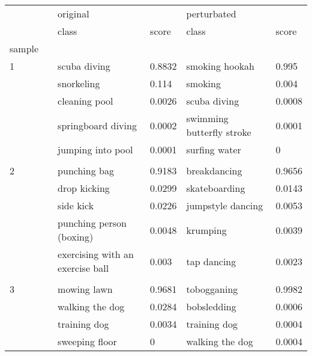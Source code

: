\begin{tabular}{llllll}
\toprule
  & {} & \multicolumn{2}{l}{original} & \multicolumn{2}{l}{perturbated} \\
  & {} &                             class &   score &                      class &   score \\
sample & {} &                                   &         &                            &         \\
\midrule
1 & {} &                      scuba diving &  0.8832 &             smoking hookah &   0.995 \\
  & {} &                        snorkeling &   0.114 &                    smoking &   0.004 \\
  & {} &                     cleaning pool &  0.0026 &               scuba diving &  0.0008 \\
  & {} &                springboard diving &  0.0002 &  swimming butterfly stroke &  0.0001 \\
  & {} &                 jumping into pool &  0.0001 &              surfing water &       0 \\
  & {} &                                   &         &                            &         \\
2 & {} &                      punching bag &  0.9183 &               breakdancing &  0.9656 \\
  & {} &                      drop kicking &  0.0299 &              skateboarding &  0.0143 \\
  & {} &                         side kick &  0.0226 &          jumpstyle dancing &  0.0053 \\
  & {} &          punching person (boxing) &  0.0048 &                   krumping &  0.0039 \\
  & {} &  exercising with an exercise ball &   0.003 &                tap dancing &  0.0023 \\
  & {} &                                   &         &                            &         \\
3 & {} &                       mowing lawn &  0.9681 &                tobogganing &  0.9982 \\
  & {} &                   walking the dog &  0.0284 &                bobsledding &  0.0006 \\
  & {} &                      training dog &  0.0034 &               training dog &  0.0004 \\
  & {} &                    sweeping floor &       0 &            walking the dog &  0.0004 \\

\end{tabular}
